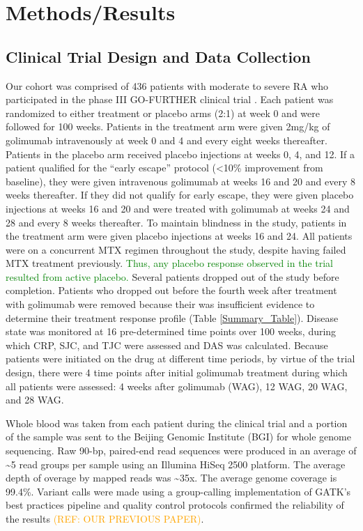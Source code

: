 
\section{Methods/Results}


\subsection{Clinical Trial Design and Data Collection}

Our cohort was comprised of 436 patients with moderate to severe RA who participated in the phase III GO-FURTHER clinical trial \cite{weinblatt_radiographic_2014,weinblatt_intravenous_2013}. Each patient was randomized to either treatment or placebo arms (2:1) at week 0 and were followed for 100 weeks. Patients in the treatment arm were given 2mg/kg of golimumab intravenously at week 0 and 4 and every eight weeks thereafter. Patients in the placebo arm received placebo injections at weeks 0, 4, and 12. If a patient qualified for the “early escape” protocol (<10\% improvement from baseline), they were given intravenous golimumab at weeks 16 and 20 and every 8 weeks thereafter. If they did not qualify for early escape, they were given placebo injections at weeks 16 and 20 and were treated with golimumab at weeks 24 and 28 and every 8 weeks thereafter. To maintain blindness in the study, patients in the treatment arm were given placebo injections at weeks 16 and 24. All patients were on a concurrent MTX regimen throughout the study, despite having failed MTX treatment previously. \textcolor{green}{Thus, any placebo response observed in the trial resulted from active placebo.} Several patients dropped out of the study before completion. Patients who dropped out before the fourth week after treatment with golimumab were removed because their was insufficient evidence to determine their treatment response profile (Table \ref{Summary_Table}). Disease state was monitored at 16 pre-determined time points over 100 weeks, during which CRP, SJC, and TJC were assessed and DAS was calculated. Because patients were initiated on the drug at different time periods, by virtue of the trial design, there were 4 time points after initial golimumab treatment during which all patients were assessed: 4 weeks after golimumab (WAG), 12 WAG, 20 WAG, and 28 WAG.

Whole blood was taken from each patient during the clinical trial and a portion of the sample was sent to the Beijing Genomic Institute (BGI) for whole genome sequencing. Raw 90-bp, paired-end read sequences were produced in an average of \textasciitilde5 read groups per sample using an Illumina HiSeq 2500 platform. The average depth of overage by mapped reads was \textasciitilde35x. The average genome coverage is 99.4\%. Variant calls were made using a group-calling implementation of GATK’s best practices pipeline and quality control protocols confirmed the reliability of the results \cite{mckenna_genome_2010} \textcolor{orange}{(REF: OUR PREVIOUS PAPER)}.

